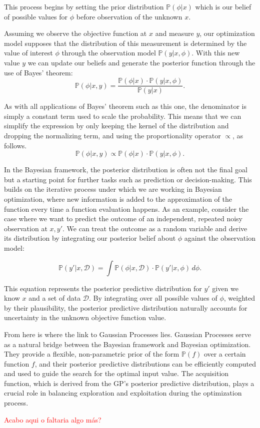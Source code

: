 This process begins by setting the prior distribution $\mathbb{P}(\phi | x)$ which is our belief of possible values for $\phi$ before observation of the unknown $x$. 

Assuming we observe the objective function at $x$ and measure $y$, our optimization model supposes that the distribution of this measurement is determined by the value of interest $\phi$ through the observation model $\mathbb{P}(y | x, \phi)$. With this new value $y$ we can update our beliefs and generate the posterior function through the use of Bayes' theorem: 
\[ \mathbb{P}(\phi | x, y) = \frac{\mathbb{P}(\phi | x) \cdot \mathbb{P}(y | x, \phi)}{\mathbb{P}(y | x)}. \] 

As with all applications of Bayes' theorem such as this one, the denominator is simply a constant term used to scale the probability. This means that we can simplify the expression by only keeping the kernel of the distribution and dropping the normalizing term, and using the proportionality operator $\propto$, as follows. 
\[ \mathbb{P}(\phi | x, y) \propto \mathbb{P}(\phi | x) \cdot \mathbb{P}(y | x, \phi). \] 

In the Bayesian framework, the posterior distribution is often not the final goal but a starting point for further tasks such as prediction or decision-making. This builds on the iterative process under which we are working in Bayesian optimization, where new information is added to the approximation of the function every time a function evaluation happens. As an example, consider the case where we want to predict the outcome of an independent, repeated noisy observation at $x, y'$. We can treat the outcome as a random variable and derive its distribution by integrating our posterior belief about $\phi$ against the observation model:

\[ \mathbb{P}(y' | x, \mathcal{D}) = \int \mathbb{P}(\phi | x, \mathcal{D}) \cdot \mathbb{P}\left(y' | x, \phi\right) \, d \phi. \]

This equation represents the posterior predictive distribution for $y'$ given we know $x$ and a set of data $\mathcal{D}$. By integrating over all possible values of $\phi$, weighted by their plausibility, the posterior predictive distribution naturally accounts for uncertainty in the unknown objective function value.

From here is where the link to Gaussian Processes lies. Gaussian Processes serve as a natural bridge between the Bayesian framework and Bayesian optimization. They provide a flexible, non-parametric prior of the form $\mathbb{P}(f)$ over a certain function $f$, and their posterior predictive distributions can be efficiently computed and used to guide the search for the optimal input value. The acquisition function, which is derived from the GP's posterior predictive distribution, plays a crucial role in balancing exploration and exploitation during the optimization process.

\textcolor{red}{Acabo aqui o faltaria algo más?}
















